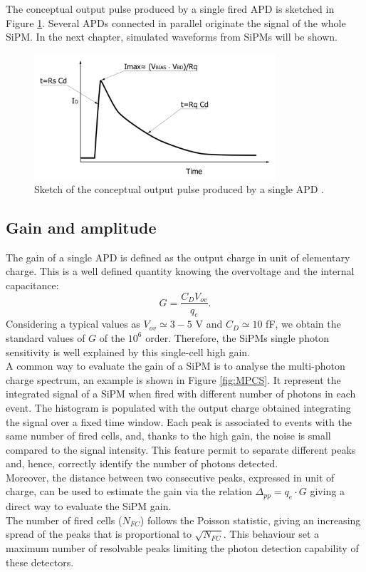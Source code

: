 The conceptual output pulse produced by a single fired APD is sketched in Figure \ref{fig:wave_example}. Several APDs connected in parallel originate the signal of the whole SiPM. In the next chapter, simulated waveforms from SiPMs will be shown.\\

\begin{figure}
	\centering
	\includegraphics[width=0.8\textwidth]{IMG/Cap3/wave_example.png}
	\caption{Sketch of the conceptual output pulse produced by a single APD \cite{SiPM_img_APD}.}
	\label{fig:wave_example}
\end{figure}

\subsection*{Gain and amplitude}
The gain of a single APD is defined as the output charge in unit of elementary charge. This is a well defined quantity knowing the overvoltage and the internal capacitance:
\begin{equation}
    G = \frac{C_D V_{ov}}{q_e}.
\end{equation}
Considering a typical values as $V_{ov} \simeq 3-5$ V and $C_D \simeq 10$ fF, we obtain the standard values of $G$ of the $10^6$ order. 
Therefore, the SiPMs single photon sensitivity is well explained by this single-cell high gain.\\
A common way to evaluate the gain of a SiPM is to analyse the multi-photon charge spectrum, an example is shown in Figure \ref{fig:MPCS}.
It represent the integrated signal of a SiPM when fired with different number of photons in each event. The histogram is populated with the output charge obtained integrating the signal over a fixed time window.
Each peak is associated to events with the same number of fired cells, and, thanks to the high gain, the noise is small compared to the signal intensity. This feature permit to separate different peaks and, hence, correctly identify the number of photons detected.\\
Moreover, the distance between two consecutive peaks, expressed in unit of charge, can be used to estimate the gain via the relation $\Delta_{pp} = q_e \cdot G$ giving a direct way to evaluate the SiPM gain.\\
The number of fired cells ($N_{FC}$) follows the Poisson statistic, giving an increasing spread of the peaks that is proportional to $\sqrt{N_{FC}}$. This behaviour set a maximum number of resolvable peaks limiting the photon detection capability of these detectors.

